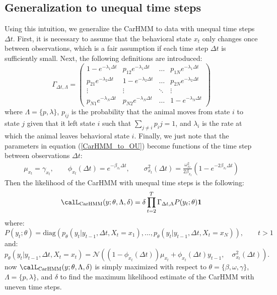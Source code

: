 



\iffalse

\subsection{Generalization to unequal time steps}

Using this intuition, we generalize the CarHMM to data with unequal time steps $\Delta t$. First, it is necessary to assume that the behavioral state $x_t$ only changes once between observations, which is a fair assumption if each time step $\Delta t$ is sufficiently small. Next, the following definitions are introduced:
%
$$\Gamma_{\Delta t,\Lambda} = \begin{pmatrix} 
1-e^{-\lambda_1 \Delta t} & p_{12} e^{-\lambda_1 \Delta t} & \dots & p_{1N} e^{-\lambda_1 \Delta t} \\
p_{21} e^{-\lambda_2 \Delta t} & 1-e^{-\lambda_2 \Delta t} & \dots & p_{2N} e^{-\lambda_2 \Delta t} \\
\vdots & \vdots & \ddots & \vdots \\
p_{N1} e^{-\lambda_N \Delta t} & p_{N2} e^{-\lambda_N \Delta t} & \dots  & 1-e^{-\lambda_N \Delta t}
\end{pmatrix}$$
%
where $\Lambda = \{p,\lambda\}$, $p_{ij}$ is the probability that the animal moves from state $i$ to state $j$ given that it left state $i$ such that $\sum_{j \neq i} p_ij = 1$, and $\lambda_i$ is the rate at which the animal leaves behavioral state $i$. Finally, we just note that the parameters in equation (\ref{CarHMM_to_OU}) become functions of the time step between observations $\Delta t$:
%
\begin{align*}
\mu_{x_t}= \gamma_{x_t}, \qquad \phi_{x_t}(\Delta t) = e^{-\beta_{x_t}\Delta t}, \qquad \sigma^2_{x_t}(\Delta t) = \frac{\omega_{x_t}^2}{2\beta_{x_t}} (1-e^{-2\beta_{x_t}\Delta t})
\end{align*}
%
Then the likelihood of the CarHMM with unequal time steps is the following:
%
$$\calL_{\text{CarHMM}}(y;\theta,\Lambda,\delta) = \delta \prod_{t=2}^{T} \Gamma_{\Delta t,\Lambda} P(y_t;\theta) \mathbf{1}$$
%
where:
%
$$P(y_t;\theta) = \text{diag}(p_\theta(y_t|y_{t-1}, \Delta t, X_t = x_1), . . . , p_\theta(y_t|y_{t-1}, \Delta t, X_t = x_N )), \qquad t > 1$$
%
and:
%
$$p_\theta(y_t|y_{t-1}, \Delta t, X_t = x_t) = \mathcal{N}\left((1-\phi_{x_t}(\Delta t))\mu_{x_t} + \phi_{x_t}(\Delta t) y_{t-1},\quad \sigma_{x_t}^2(\Delta t) \right).$$
%
now $\calL_{\text{CarHMM}}(y;\theta,\Lambda,\delta)$ is simply maximized with respect to $\theta = \{\beta,\omega,\gamma\}$, $\Lambda = \{p,\lambda\}$, and $\delta$ to find the maximum likelihood estimate of the CarHMM with uneven time steps.


